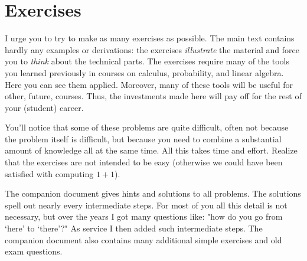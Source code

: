

\section*{Exercises}

I urge you to try to make as many exercises as possible.
The main text contains hardly any examples or derivations: the exercises \emph{illustrate} the material and force you to \textit{think} about the technical parts.
The exercises require many of the tools you learned previously in courses on calculus, probability, and linear algebra.
Here you can see them applied.
Moreover, many of these tools will be useful for other, future, courses.
Thus, the investments made here will pay off for the rest of your (student) career.

You'll notice that some of these problems are quite difficult, often not because the problem itself is difficult, but because you need to combine a substantial amount of knowledge all at the same time.
All this takes time and effort.
Realize that the exercises are not intended to be easy (otherwise we could have been satisfied with computing $1+1$).

The companion document gives hints and solutions to all problems.
The solutions spell out nearly every intermediate steps.
For most of you all this detail is not necessary, but over the years I got many questions like: "how do you go from `here' to `there'?"
As service I then added such intermediate steps.
The companion document also contains many additional simple exercises and old exam questions.

